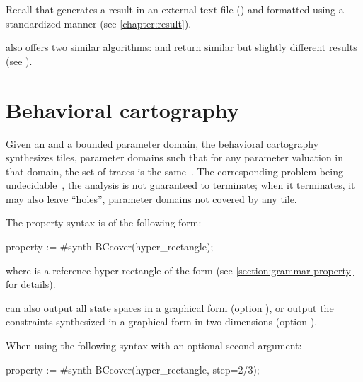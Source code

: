 Recall that \imitator{} %
generates
a result in an external text file () and formatted using a standardized manner (see \cref{chapter:result}). %


\imitator{} also offers two similar algorithms:  and  return similar but slightly different results (see \cite{AS11}).


\section{Behavioral cartography}\label{ss:mode:BC}

Given an \NIPTA{} and a bounded parameter domain, the behavioral cartography~\BC{} synthesizes tiles, \ie{} parameter domains such that for any parameter valuation in that domain, the set of traces is the same~\cite{AF10}.
The corresponding problem being undecidable~\cite{ALM20}, the analysis is not guaranteed to terminate; when it terminates, it may also leave ``holes'', \ie{} parameter domains not covered by any tile.

The property syntax is of the following form:

\begin{IMITATORproperty}
property := #synth BCcover(hyper_rectangle);
\end{IMITATORproperty}

\noindent{}
where  is a reference hyper-rectangle of the form  (see \cref{section:grammar-property} for details).


\imitator{} can also
output all state spaces in a graphical form (option ),
or
output the constraints synthesized in a graphical form in two dimensions (option ).

When using the following syntax with an optional second argument:

\begin{IMITATORproperty}
property := #synth BCcover(hyper_rectangle, step=2/3);
\end{IMITATORproperty}

